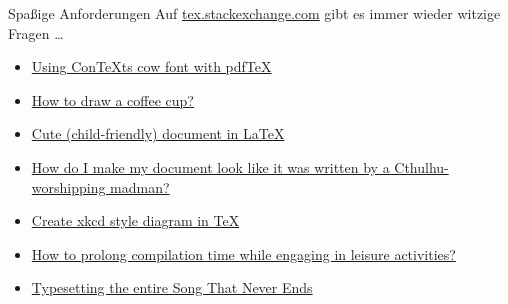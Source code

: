 \documentclass[
	vorläufig=false,
	datum=2021-12-22,
	titel={Witziges, Obskures und Sinnvolles…},
	web=false,
 	aspectratio=1610,
 	max,
]{../tex/latexkurs-slides}
\begin{document}
\begin{frame}{Spaßige Anforderungen}
	Auf \url{tex.stackexchange.com} gibt es immer wieder witzige Fragen …
	\begin{itemize}
		\item \href{http://tex.stackexchange.com/questions/115471/using-contexts-cow-font-with-pdftex}{Using ConTeXts cow font with pdfTeX}
		\item \href{http://tex.stackexchange.com/questions/145223/how-to-draw-a-coffee-cup}{How to draw a coffee cup?}
		\item \href{http://tex.stackexchange.com/questions/63732/cute-child-friendly-document-in-latex}{Cute (child-friendly) document in LaTeX}
		\item \href{http://tex.stackexchange.com/questions/29402/how-do-i-make-my-document-look-like-it-was-written-by-a-cthulhu-worshipping-madm}{How do I make my document look like it was written by a Cthulhu-worshipping madman?}
		\item \href{http://tex.stackexchange.com/questions/74878/create-xkcd-style-diagram-in-tex}{Create xkcd style diagram in TeX}
\item \href{https://tex.stackexchange.com/questions/122116/how-to-prolong-compilation-time-while-engaging-in-leisure-activities}{How to prolong compilation time while engaging in leisure activities?}
	\item \href{https://tex.stackexchange.com/questions/95783/typesetting-the-entire-song-that-never-ends}{Typesetting the entire Song That Never Ends}
	\end{itemize}
\end{frame}
\end{document}
